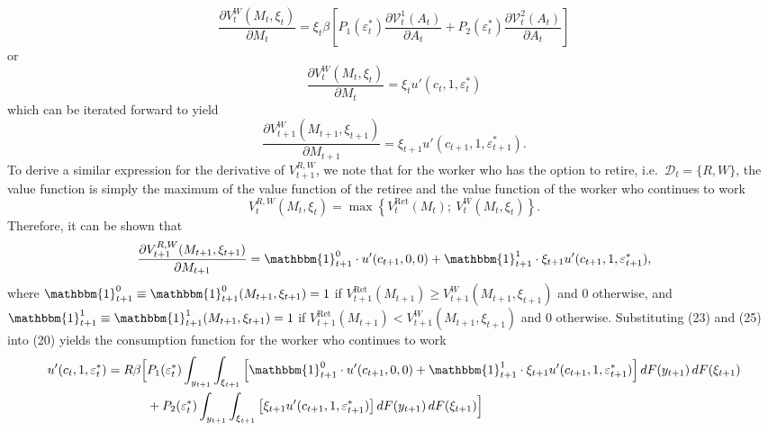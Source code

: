 \documentclass[11pt]{article}
\newcommand{\Ret}{\mathrm{Ret}}
\newcommand{\eff}{\varepsilon}
\newcommand{\goth}[1]{\mathcal{#1}}   %
\begin{document}
\begin{equation}
\frac{\partial V_t^{W}(M_t, \xi_t)}{\partial M_t}
= \xi_t \beta \left[
P_1(\eff_t^*) \frac{\partial \goth{V}_t^1(A_t)}{\partial A_t}
+ P_2(\eff_t^*) \frac{\partial \goth{V}_t^2(A_t)}{\partial A_t}
\right]
\end{equation}
or
\begin{equation}
\frac{\partial V_t^{W}(M_t, \xi_t)}{\partial M_t} = \xi_t u'(c_t, 1, \eff_t^*)
\end{equation}
which can be iterated forward to yield
\begin{equation}
\frac{\partial V_{t+1}^{W}(M_{t+1}, \xi_{t+1})}{\partial M_{t+1}}
= \xi_{t+1} u'(c_{t+1}, 1, \eff_{t+1}^*).
\end{equation}
To derive a similar expression for the derivative of $V_{t+1}^{R,W}$, we note that for the worker
who has the option to retire, i.e.\ $\mathcal{D}_t = \{R, W\}$, the value function is simply the
maximum of the value function of the retiree and the value function of the worker who
continues to work
\begin{equation}
V_t^{R,W}(M_t, \xi_t) = \max \left\{ V_t^{\Ret}(M_t);\ V_t^{W}(M_t, \xi_t) \right\}.
\end{equation}
Therefore, it can be shown that
\begin{equation}
\frac{\partial V_{t+1}^{R,W}(M_{t+1}, \xi_{t+1})}{\partial M_{t+1}}
= \mathbbm{1}_{t+1}^0 \cdot u'(c_{t+1}, 0, 0)
+ \mathbbm{1}_{t+1}^1 \cdot \xi_{t+1} u'(c_{t+1}, 1, \eff_{t+1}^*),
\end{equation}
where $\mathbbm{1}_{t+1}^0 \equiv \mathbbm{1}_{t+1}^0(M_{t+1}, \xi_{t+1}) = 1$ if $V_{t+1}^{\Ret}(M_{t+1}) \ge V_{t+1}^{W}(M_{t+1}, \xi_{t+1})$ and $0$ otherwise,
and $\mathbbm{1}_{t+1}^1 \equiv \mathbbm{1}_{t+1}^1(M_{t+1}, \xi_{t+1}) = 1$ if $V_{t+1}^{\Ret}(M_{t+1}) < V_{t+1}^{W}(M_{t+1}, \xi_{t+1})$ and $0$ otherwise.
Substituting (23) and (25) into (20) yields the consumption function for the worker
who continues to work
\begin{equation}
\begin{aligned}
u'(c_t, 1, \eff_t^*) = R \beta \Big[
&P_1(\eff_t^*) \int_{y_{t+1}} \int_{\xi_{t+1}}
\left[ \mathbbm{1}_{t+1}^0 \cdot u'(c_{t+1}, 0, 0)
+ \mathbbm{1}_{t+1}^1 \cdot \xi_{t+1} u'(c_{t+1}, 1, \eff_{t+1}^*) \right]
dF(y_{t+1})\, dF(\xi_{t+1}) \\
&+ P_2(\eff_t^*) \int_{y_{t+1}} \int_{\xi_{t+1}}
\left[ \xi_{t+1} u'(c_{t+1}, 1, \eff_{t+1}^*) \right]
dF(y_{t+1})\, dF(\xi_{t+1})
\Big]
\end{aligned}
\end{equation}
\end{document}
